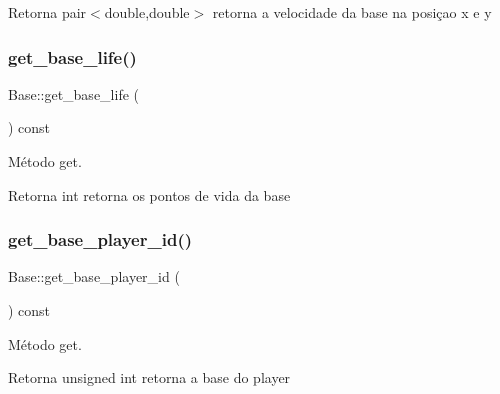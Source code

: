 \begin{DoxyReturn}{Retorna}
pair$<$double,double$>$ retorna a velocidade da base na posiçao x e y 
\end{DoxyReturn}
\mbox{\label{classBase_a0bbcf57387f5860d74f6d2c4b9aecfba}} 
\subsubsection{\texorpdfstring{get\+\_\+base\+\_\+life()}{get\_base\_life()}}
{\footnotesize\ttfamily Base\+::get\+\_\+base\+\_\+life (\begin{DoxyParamCaption}{ }\end{DoxyParamCaption}) const\hspace{0.3cm}{\ttfamily [inline]}}



Método get. 

\begin{DoxyReturn}{Retorna}
int retorna os pontos de vida da base 
\end{DoxyReturn}
\mbox{\label{classBase_ace6b801fb729303a97c6edf0c5e38f70}} 
\subsubsection{\texorpdfstring{get\+\_\+base\+\_\+player\+\_\+id()}{get\_base\_player\_id()}}
{\footnotesize\ttfamily Base\+::get\+\_\+base\+\_\+player\+\_\+id (\begin{DoxyParamCaption}{ }\end{DoxyParamCaption}) const\hspace{0.3cm}{\ttfamily [inline]}}



Método get. 

\begin{DoxyReturn}{Retorna}
unsigned int retorna a base do player 
\end{DoxyReturn}
\mbox{\label{classBase_aacfcf7a911c60d8718219d45f8422449}} 

